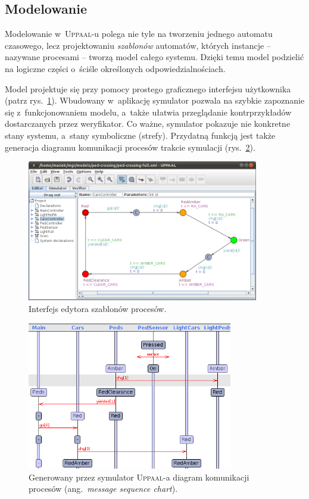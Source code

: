 \documentclass{pracamgr}
\newcommand{\ang}[1]{(ang.~\emph{#1})}
\newcommand{\upp}{\textsc{Uppaal}}
\theoremstyle{plain}
\begin{document}
\subsection{Modelowanie}
Modelowanie w~\upp-u polega nie tyle na tworzeniu jednego automatu
czasowego, lecz projektowaniu \emph{szablonów} automatów, których
instancje -- nazywane procesami -- tworzą model całego systemu. Dzięki
temu model podzielić na logiczne części o~ściśle określonych
odpowiedzialnościach.

Model projektuje się przy pomocy prostego graficznego interfejsu
użytkownika (patrz rys.~\ref{img:uppaal-gui}). Wbudowany w~aplikację
symulator pozwala na szybkie zapoznanie się z~funkcjonowaniem modelu,
a~także ułatwia przeglądanie kontrprzykładów dostarczanych przez
weryfikator. Co ważne, symulator pokazuje nie konkretne stany systemu,
a~stany symboliczne (strefy). Przydatną funkcją jest także generacja
diagramu komunikacji procesów trakcie symulacji
(rys.~\ref{img:uppaal-msc}).
\begin{figure}
  \centering
  \includegraphics[width=0.9\textwidth]{img/uppaal-editor.png}
  \caption{Interfejs edytora szablonów procesów.}
  \label{img:uppaal-gui}
\end{figure}

\begin{figure}
  \centering
  \includegraphics[width=0.8\textwidth]{img/uppaal-msc.png}
  \caption{Generowany przez symulator \upp-a diagram komunikacji
    procesów \ang{message sequence chart}.}
  \label{img:uppaal-msc}
\end{figure}
\end{document}
